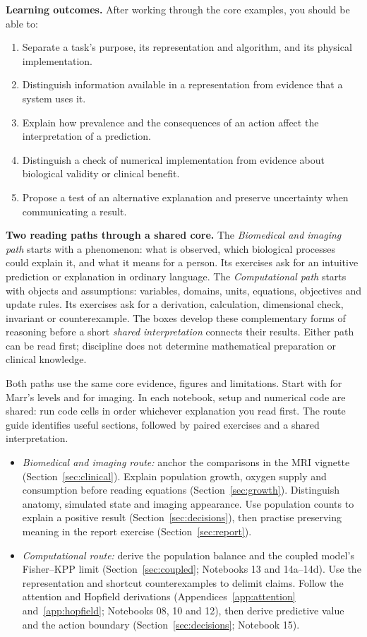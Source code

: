 \documentclass[11pt,a4paper]{article}
\begin{document}
\textbf{Learning outcomes.} After working through the core examples, you should be able to:
\begin{enumerate}
\item Separate a task's purpose, its representation and algorithm, and its physical implementation.
\item Distinguish information available in a representation from evidence that a system uses it.
\item Explain how prevalence and the consequences of an action affect the interpretation of a prediction.
\item Distinguish a check of numerical implementation from evidence about biological validity or clinical benefit.
\item Propose a test of an alternative explanation and preserve uncertainty when communicating a result.
\end{enumerate}

\textbf{Two reading paths through a shared core.}
The \emph{Biomedical and imaging path} starts with a phenomenon: what is observed, which biological processes could explain it, and what it means for a person. Its exercises ask for an intuitive prediction or explanation in ordinary language. The \emph{Computational path} starts with objects and assumptions: variables, domains, units, equations, objectives and update rules. Its exercises ask for a derivation, calculation, dimensional check, invariant or counterexample. The boxes develop these complementary forms of reasoning before a short \emph{shared interpretation} connects their results. Either path can be read first; discipline does not determine mathematical preparation or clinical knowledge.

Both paths use the same core evidence, figures and limitations. Start with  for Marr's levels and  for imaging. In each notebook, setup and numerical code are shared: run code cells in order whichever explanation you read first. The route guide identifies useful sections, followed by paired exercises and a shared interpretation.
\begin{itemize}
\item \emph{Biomedical and imaging route:} anchor the comparisons in the MRI vignette (Section~\ref{sec:clinical}). Explain population growth, oxygen supply and consumption before reading equations (Section~\ref{sec:growth}). Distinguish anatomy, simulated state and imaging appearance. Use population counts to explain a positive result (Section~\ref{sec:decisions}), then practise preserving meaning in the report exercise (Section~\ref{sec:report}).
\item \emph{Computational route:} derive the population balance and the coupled model's Fisher--KPP limit (Section~\ref{sec:coupled}; Notebooks 13 and 14a--14d). Use the representation and shortcut counterexamples to delimit claims. Follow the attention and Hopfield derivations (Appendices~\ref{app:attention} and~\ref{app:hopfield}; Notebooks 08, 10 and 12), then derive predictive value and the action boundary (Section~\ref{sec:decisions}; Notebook 15).
\end{itemize}
\end{document}
